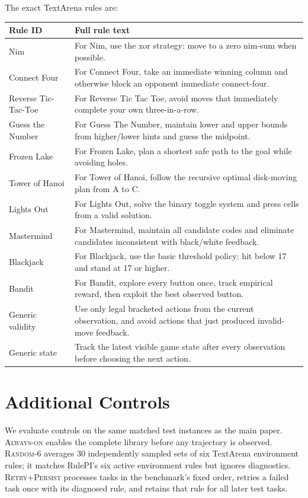 \documentclass[11pt]{article}
\begin{document}
The exact TextArena rules are:
\begin{center}
\scriptsize
\setlength{\tabcolsep}{3pt}
\begin{tabular}{p{}p{}}
\toprule
Rule ID & Full rule text \\
\midrule
Nim & For Nim, use the xor strategy: move to a zero nim-sum when possible. \\
Connect Four & For Connect Four, take an immediate winning column and otherwise block an opponent immediate connect-four. \\
Reverse Tic-Tac-Toe & For Reverse Tic Tac Toe, avoid moves that immediately complete your own three-in-a-row. \\
Guess the Number & For Guess The Number, maintain lower and upper bounds from higher/lower hints and guess the midpoint. \\
Frozen Lake & For Frozen Lake, plan a shortest safe path to the goal while avoiding holes. \\
Tower of Hanoi & For Tower of Hanoi, follow the recursive optimal disk-moving plan from A to C. \\
Lights Out & For Lights Out, solve the binary toggle system and press cells from a valid solution. \\
Mastermind & For Mastermind, maintain all candidate codes and eliminate candidates inconsistent with black/white feedback. \\
Blackjack & For Blackjack, use the basic threshold policy: hit below 17 and stand at 17 or higher. \\
Bandit & For Bandit, explore every button once, track empirical reward, then exploit the best observed button. \\
\midrule
Generic validity & Use only legal bracketed actions from the current observation, and avoid actions that just produced invalid-move feedback. \\
Generic state & Track the latest visible game state after every observation before choosing the next action. \\
\bottomrule
\end{tabular}
\end{center}

\clearpage
\section{Additional Controls}

We evaluate controls on the same matched test instances as the main paper.
\textsc{Always-on} enables the complete library before any trajectory is observed.
\textsc{Random-6} averages 30 independently sampled sets of six TextArena environment rules; it matches RulePI's six active environment rules but ignores diagnostics.
\textsc{Retry+Persist} processes tasks in the benchmark's fixed order, retries a failed task once with its diagnosed rule, and retains that rule for all later test tasks.
\end{document}
